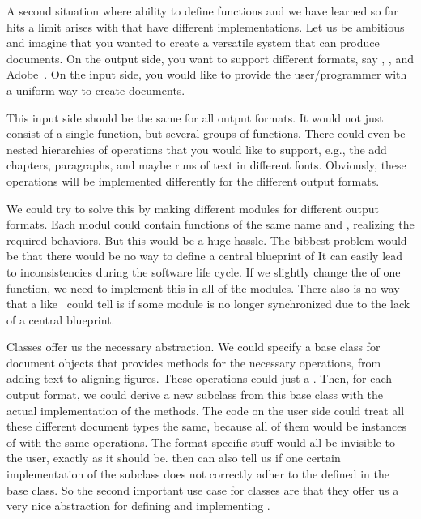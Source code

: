 A second situation where ability to define functions and we have learned so far hits a limit arises with  that have different implementations.
Let us be ambitious and imagine that you wanted to create a versatile system that can produce documents.
On the output side, you want to support different formats, say \libreoffice{}, \microsoftWord{}, and Adobe~.
On the input side, you would like to provide the user/programmer with a uniform way to create documents.

This input side  should be the same for all output formats.
It would not just consist of a single function, but several groups of functions.
There could even be nested hierarchies of operations that you would like to support, e.g., the add chapters, paragraphs, and maybe runs of text in different fonts.
Obviously, these operations will be implemented differently for the different output formats.

We could try to solve this by making different modules for different output formats.
Each modul could contain functions of the same name and , realizing the required behaviors.
But this would be a huge hassle.
The bibbest problem would be that there would be no way to define a central blueprint of 
It can easily lead to inconsistencies during the software life cycle.
If we slightly change the  of one function, we need to implement this in all of the modules.
There also is no way that a  like \ruff\ could tell is if some module is no longer synchronized due to the lack of a central blueprint.

Classes offer us the necessary abstraction.
We could specify a base class  for document objects that provides methods for the necessary operations, from adding text to aligning figures.
These operations could just  a .
Then, for each output format, we could derive a new subclass from this base class with the actual implementation of the methods.
The code on the user side could treat all these different document types the same, because all of them would be instances of  with the same operations.
The format-specific stuff would all be invisible to the user, exactly as it should be.
 then can also tell us if one certain implementation of the subclass does not correctly adher to the  defined in the base class.
So the second important use case for classes are that they offer us a very nice abstraction for defining and implementing .

